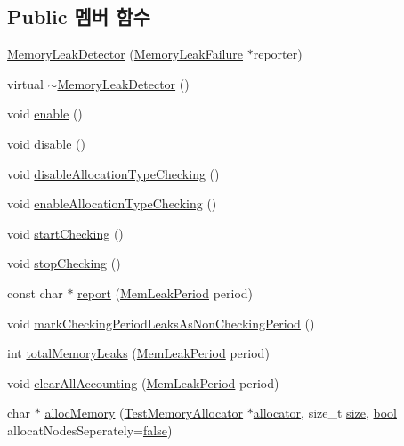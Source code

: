 \subsection*{Public 멤버 함수}
\begin{DoxyCompactItemize}
\item 
\hyperlink{class_memory_leak_detector_adce0cc8ded968fc3af6035ed9aebe949}{Memory\+Leak\+Detector} (\hyperlink{class_memory_leak_failure}{Memory\+Leak\+Failure} $\ast$reporter)
\item 
virtual \hyperlink{class_memory_leak_detector_aee92c9e1fa761a77145ad0b7b3b4e8e7}{$\sim$\+Memory\+Leak\+Detector} ()
\item 
void \hyperlink{class_memory_leak_detector_a486f22824bd83c5308a0d70ffac6f758}{enable} ()
\item 
void \hyperlink{class_memory_leak_detector_a8cfbbe53c1cf6e3054736daea3044c0f}{disable} ()
\item 
void \hyperlink{class_memory_leak_detector_a87bbe373712386442509ec83e9444021}{disable\+Allocation\+Type\+Checking} ()
\item 
void \hyperlink{class_memory_leak_detector_a4ef0d2380dbe5ecfa77d2d477d9047e9}{enable\+Allocation\+Type\+Checking} ()
\item 
void \hyperlink{class_memory_leak_detector_ae912c5ee9034b76f13f1c9dbab55e512}{start\+Checking} ()
\item 
void \hyperlink{class_memory_leak_detector_a9e85551d474d895ba8852b8e56481c7c}{stop\+Checking} ()
\item 
const char $\ast$ \hyperlink{class_memory_leak_detector_acc70330c27080c4b09b96342929dc9ca}{report} (\hyperlink{_memory_leak_detector_8h_ab248e6cc6c6699b88b002286d8a3ed76}{Mem\+Leak\+Period} period)
\item 
void \hyperlink{class_memory_leak_detector_a6db202697cf20e8d84748b129c403545}{mark\+Checking\+Period\+Leaks\+As\+Non\+Checking\+Period} ()
\item 
int \hyperlink{class_memory_leak_detector_a7b0c5d9c4d678d6e0081802416660803}{total\+Memory\+Leaks} (\hyperlink{_memory_leak_detector_8h_ab248e6cc6c6699b88b002286d8a3ed76}{Mem\+Leak\+Period} period)
\item 
void \hyperlink{class_memory_leak_detector_a6c18f981e1c2139528a10aa573ffeaa9}{clear\+All\+Accounting} (\hyperlink{_memory_leak_detector_8h_ab248e6cc6c6699b88b002286d8a3ed76}{Mem\+Leak\+Period} period)
\item 
char $\ast$ \hyperlink{class_memory_leak_detector_a15c9b9fb87d6e63d8972f03e25fb3cf5}{alloc\+Memory} (\hyperlink{class_test_memory_allocator}{Test\+Memory\+Allocator} $\ast$\hyperlink{_memory_leak_warning_test_8cpp_a83fc2e9b9142613f7df2bcc3ff8292bc}{allocator}, size\+\_\+t \hyperlink{gst__avb__playbin_8c_a439227feff9d7f55384e8780cfc2eb82}{size}, \hyperlink{avb__gptp_8h_af6a258d8f3ee5206d682d799316314b1}{bool} allocat\+Nodes\+Seperately=\hyperlink{avb__gptp_8h_af6a258d8f3ee5206d682d799316314b1ae9de385ef6fe9bf3360d1038396b884c}{false})

\end{DoxyCompactItemize}
